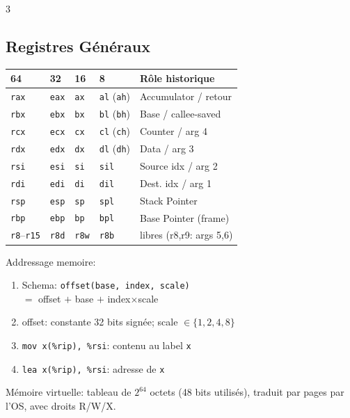 \documentclass[12pt, a4paper]{article}
\begin{document}
\begin{multicols*}{3}
	\subsection{Registres Généraux}
	\begin{tabular}{|l|l|l|l|l|}
		\hline
		\textbf{64}               & \textbf{32}  & \textbf{16}  & \textbf{8}                & \textbf{Rôle historique } \\
		\hline
		\texttt{rax}              & \texttt{eax} & \texttt{ax}  & \texttt{al} (\texttt{ah}) & Accumulator / retour      \\
		\texttt{rbx}              & \texttt{ebx} & \texttt{bx}  & \texttt{bl} (\texttt{bh}) & Base / callee-saved       \\
		\texttt{rcx}              & \texttt{ecx} & \texttt{cx}  & \texttt{cl} (\texttt{ch}) & Counter / arg 4           \\
		\texttt{rdx}              & \texttt{edx} & \texttt{dx}  & \texttt{dl} (\texttt{dh}) & Data / arg 3              \\
		\texttt{rsi}              & \texttt{esi} & \texttt{si}  & \texttt{sil}              & Source idx / arg 2        \\
		\texttt{rdi}              & \texttt{edi} & \texttt{di}  & \texttt{dil}              & Dest. idx / arg 1         \\
		\texttt{rsp}              & \texttt{esp} & \texttt{sp}  & \texttt{spl}              & Stack Pointer             \\
		\texttt{rbp}              & \texttt{ebp} & \texttt{bp}  & \texttt{bpl}              & Base Pointer (frame)      \\
		\texttt{r8}--\texttt{r15} & \texttt{r8d} & \texttt{r8w} & \texttt{r8b}              & libres (r8,r9: args 5,6)  \\
		\hline
	\end{tabular}

	Addressage memoire:
	\begin{enumerate}[\roman*.]
		\item Schema: \lstinline|offset(base, index, scale)| \\$=$ offset $+$ base $+$ index$\times$scale
		\item offset: constante 32 bits signée; scale $\in\{1,2,4,8\}$
		\item \lstinline|mov x(%rip), %rsi|: contenu au label \lstinline|x|
		\item \lstinline|lea x(%rip), %rsi|: adresse de \lstinline|x|
	\end{enumerate}
	Mémoire virtuelle: tableau de $2^{64}$ octets (48 bits utilisés), traduit par pages par l'OS, avec droits R/W/X.


\end{multicols*}
\end{document}
